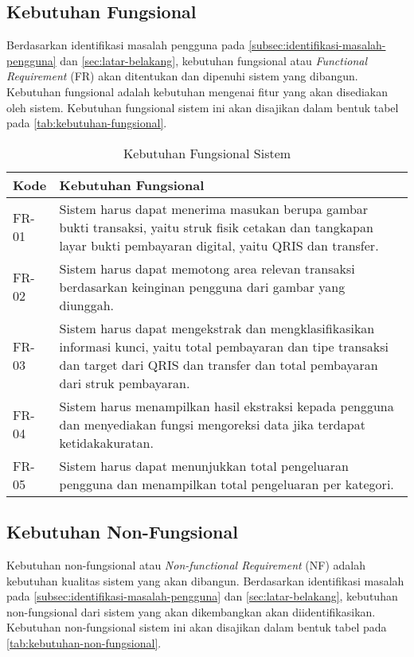 \subsection{Kebutuhan Fungsional}
\label{subsec:kebutuhan-fungsional}
Berdasarkan identifikasi masalah pengguna pada \autoref{subsec:identifikasi-masalah-pengguna} dan \autoref{sec:latar-belakang}, kebutuhan fungsional atau \emph{Functional Requirement} (FR) akan ditentukan dan dipenuhi sistem yang dibangun. Kebutuhan fungsional adalah kebutuhan mengenai fitur yang akan disediakan oleh sistem. Kebutuhan fungsional  sistem ini akan disajikan dalam bentuk tabel pada \autoref{tab:kebutuhan-fungsional}.

\begin{table}[h!]
\caption{Kebutuhan Fungsional Sistem}
\label{tab:kebutuhan-fungsional}
\begin{tabularx}{\linewidth}{|l|X|}
\hline
\textbf{Kode} & \textbf{Kebutuhan Fungsional} \\
\hline
FR-01 & Sistem harus dapat menerima masukan berupa gambar bukti transaksi, yaitu struk fisik cetakan dan tangkapan layar bukti pembayaran digital, yaitu QRIS dan transfer. \\
\hline
FR-02 & Sistem harus dapat memotong area relevan transaksi berdasarkan \newline keinginan pengguna dari gambar yang diunggah. \\
\hline
FR-03 & Sistem harus dapat mengekstrak dan mengklasifikasikan informasi \newline kunci, yaitu total pembayaran dan tipe transaksi dan target dari QRIS dan transfer dan total pembayaran dari struk pembayaran. \\
\hline
FR-04 & Sistem harus menampilkan hasil ekstraksi kepada pengguna dan menyediakan fungsi mengoreksi data jika terdapat ketidakakuratan. \\
\hline
FR-05 & Sistem harus dapat menunjukkan total pengeluaran pengguna dan menampilkan total pengeluaran per kategori. \\
\hline
\end{tabularx}
\end{table}

\subsection{Kebutuhan Non-Fungsional}
\label{subsec:kebutuhan-non-fungsional}
Kebutuhan non-fungsional atau \emph{Non-functional Requirement} (NF) adalah kebutuhan kualitas sistem yang akan dibangun. Berdasarkan identifikasi masalah pada \autoref{subsec:identifikasi-masalah-pengguna} dan \autoref{sec:latar-belakang}, kebutuhan non-fungsional dari sistem yang akan dikembangkan akan diidentifikasikan. Kebutuhan non-fungsional sistem ini akan disajikan dalam bentuk tabel pada \autoref{tab:kebutuhan-non-fungsional}.

